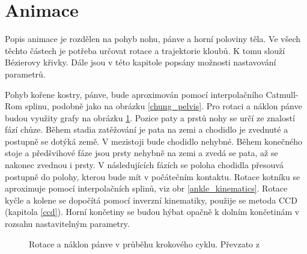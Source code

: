 \section{Animace}
Popis animace je rozdělen na pohyb nohu, pánve a horní poloviny těla. Ve všech těchto částech je potřeba určovat rotace a trajektorie kloubů. K tomu slouží Bézierovy křivky. Dále jsou v této kapitole popsány možnosti nastavování parametrů.

Pohyb kořene kostry, pánve, bude aproximován pomocí interpolačního Catmull-Rom splinu, podobně jako na obrázku \ref{chung_pelvis}. Pro rotaci a náklon pánve budou využity grafy na obrázku \ref{pelvic kinematics}. Pozice paty a prstů nohy se určí ze znalostí fází chůze. Během stadia zatěžování je pata na zemi a chodidlo je zvednuté a postupně se dotýká země. V mezistoji bude chodidlo nehybné. Během konečného stoje a předšvihové fáze jsou prsty nehybně na zemi a zvedá se pata, až se nakonec zvednou i prsty. V následujících fázích se poloha chodidla přesouvá postupně do polohy, kterou bude mít v počátečním kontaktu. Rotace kotníku se aproximuje pomocí interpolačních splinů, viz obr \ref{ankle_kinematics}. Rotace kyčle a kolene se dopočítá pomocí inverzní kinematiky, použije se metoda CCD (kapitola \ref{ccd}). Horní končetiny se budou hýbat opačně k dolním končetinám v rozsahu nastavitelným parametry.

\begin{figure}[h]
\begin{center}
\qquad
{}
\caption{Rotace a náklon pánve v průběhu krokového cyklu. Převzato z \cite{biomechanika_chuze}} \label{pelvic kinematics}
\end{center}
\end{figure}

